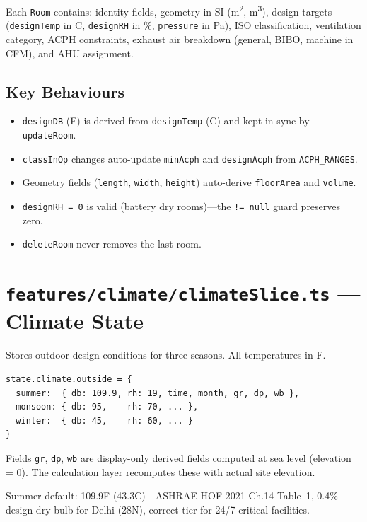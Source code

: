 \documentclass[12pt, a4paper, oneside]{report}
\newcommand{\file}[1]{\texttt{\textcolor{codeblue}{#1}}}
\newcommand{\code}[1]{\texttt{\textcolor{codered}{#1}}}
\begin{document}
Each \code{Room} contains: identity fields, geometry in SI (m\textsuperscript{2}, m\textsuperscript{3}), design targets (\code{designTemp} in \textdegree C, \code{designRH} in \%, \code{pressure} in Pa), ISO classification, ventilation category, ACPH constraints, exhaust air breakdown (general, BIBO, machine in CFM), and AHU assignment.

\subsection{Key Behaviours}
\begin{itemize}
  \item \code{designDB} (\textdegree F) is derived from \code{designTemp} (\textdegree C) and kept in sync by \code{updateRoom}.
  \item \code{classInOp} changes auto-update \code{minAcph} and \code{designAcph} from \code{ACPH\_RANGES}.
  \item Geometry fields (\code{length}, \code{width}, \code{height}) auto-derive \code{floorArea} and \code{volume}.
  \item \code{designRH = 0} is valid (battery dry rooms)---the \code{!= null} guard preserves zero.
  \item \code{deleteRoom} never removes the last room.
\end{itemize}

\section{\file{features/climate/climateSlice.ts} --- Climate State}

Stores outdoor design conditions for three seasons. All temperatures in \textdegree F.

\begin{lstlisting}[language={}, caption={Climate State Shape}]
state.climate.outside = {
  summer:  { db: 109.9, rh: 19, time, month, gr, dp, wb },
  monsoon: { db: 95,    rh: 70, ... },
  winter:  { db: 45,    rh: 60, ... }
}
\end{lstlisting}

Fields \code{gr}, \code{dp}, \code{wb} are display-only derived fields computed at sea level (elevation = 0). The calculation layer recomputes these with actual site elevation.

Summer default: 109.9\textdegree F (43.3\textdegree C)---ASHRAE HOF 2021 Ch.14 Table~1, 0.4\% design dry-bulb for Delhi (28\textdegree N), correct tier for 24/7 critical facilities.
\end{document}
